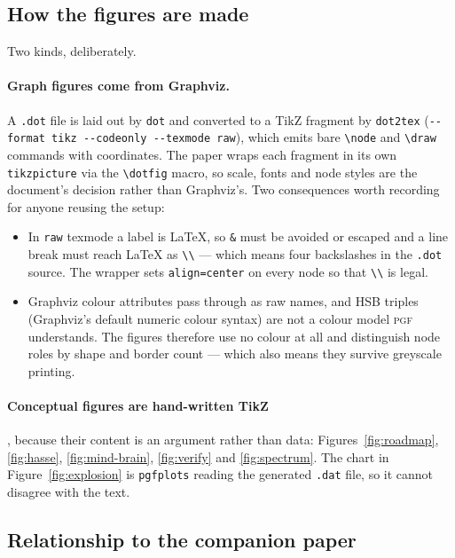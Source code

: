 \subsection*{How the figures are made}

Two kinds, deliberately.

\paragraph{Graph figures come from Graphviz.} A \texttt{.dot} file is laid out
by \texttt{dot} and converted to a TikZ fragment by \texttt{dot2tex}
(\verb|--format tikz --codeonly --texmode raw|), which emits bare
\verb|\node| and \verb|\draw| commands with coordinates. The paper wraps each
fragment in its own \texttt{tikzpicture} via the \verb|\dotfig| macro, so
scale, fonts and node styles are the document's decision rather than
Graphviz's. Two consequences worth recording for anyone reusing the setup:

\begin{itemize}[leftmargin=1.4em]
\item In \texttt{raw} texmode a label is LaTeX, so \verb|&| must be avoided or
  escaped and a line break must reach LaTeX as \verb|\\| --- which means four
  backslashes in the \texttt{.dot} source. The wrapper sets
  \texttt{align=center} on every node so that \verb|\\| is legal.
\item Graphviz colour attributes pass through as raw names, and HSB triples
  (Graphviz's default numeric colour syntax) are not a colour model
  \textsc{pgf} understands. The figures therefore use no colour at all and
  distinguish node roles by shape and border count --- which also means they
  survive greyscale printing.
\end{itemize}

\paragraph{Conceptual figures are hand-written TikZ}, because their content is
an argument rather than data: Figures~\ref{fig:roadmap},
\ref{fig:hasse}, \ref{fig:mind-brain}, \ref{fig:verify} and
\ref{fig:spectrum}. The chart in Figure~\ref{fig:explosion} is
\texttt{pgfplots} reading the generated \texttt{.dat} file, so it cannot
disagree with the text.

\subsection*{Relationship to the companion paper}

